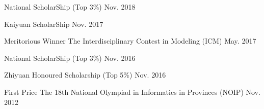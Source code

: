 
\begin{cvhonors}

  \cvhonortop
	{National ScholarShip} %
	{(Top 3\%)} %
	{} %
	{Nov. 2018} %

  \cvhonortop
	{Kaiyuan ScholarShip} %
	{} %
	{} %
	{Nov. 2017} %

  \cvhonor
    {Meritorious Winner} %
    {The Interdisciplinary Contest in Modeling (ICM)} %
    {} %
    {May. 2017} %

  \cvhonortop
    {National ScholarShip } %
    {(Top 3\%)} %
    {} %
    {Nov. 2016} %

  \cvhonortop
    {Zhiyuan Honoured Scholarship} %
    {(Top 5\%)} %
    {} %
    {Nov. 2016} %

  \cvhonor
    {First Price} %
    {The 18th National Olympiad in Informatics in Provinces (NOIP)} %
    {} %
    {Nov. 2012} %


\end{cvhonors}
